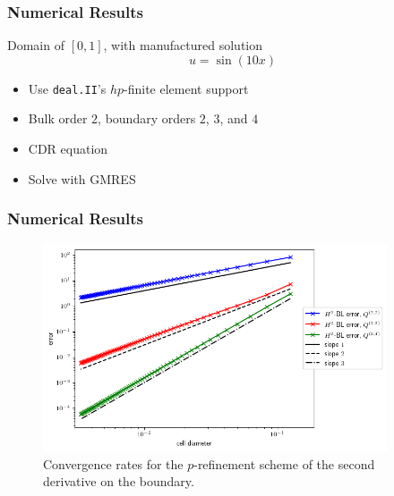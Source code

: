 \documentclass[8pt]{beamer}
\begin{document}
\begin{frame}
    \frametitle{Numerical Results}
    Domain of \([0, 1]\), with manufactured solution
    \begin{equation*}
        u = \sin(10 x)
    \end{equation*}
    \begin{itemize}
        \item Use \texttt{deal.II}'s \(hp\)-finite element support
        \item Bulk order \(2\), boundary orders \(2\), \(3\), and \(4\)
        \item CDR equation
        \item Solve with GMRES
    \end{itemize}
\end{frame}

\begin{frame}
    \frametitle{Numerical Results}
    \begin{figure}
        \centering
        \includegraphics[width=4in]{Pictures/oned-cdr-2-h2-errors.png}

        \caption{Convergence rates for the \(p\)-refinement scheme of the second
        derivative on the boundary.}
    \end{figure}
\end{frame}
\end{document}
